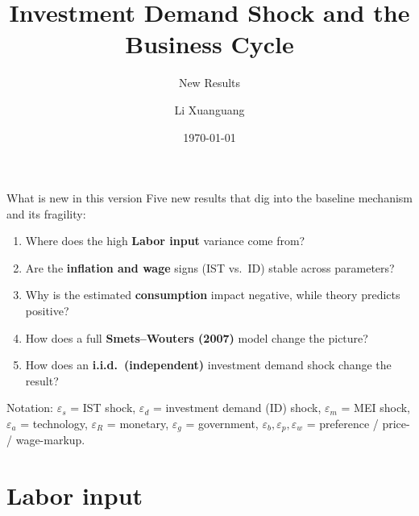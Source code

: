 \documentclass[10pt]{beamer}
\title{Investment Demand Shock and the Business Cycle}
\subtitle{New Results}
\author{Li Xuanguang}
\date{\today}
\begin{document}
\begin{frame}
	\titlepage
\end{frame}

\begin{frame}{What is new in this version}
	Five new results that dig into the baseline mechanism and its fragility:
	\begin{enumerate}
		\item Where does the high \textbf{Labor input} variance come from?
		\item Are the \textbf{inflation and wage} signs (IST vs.\ ID) stable across parameters?
		\item Why is the estimated \textbf{consumption} impact negative, while theory predicts positive?
		\item How does a full \textbf{Smets--Wouters (2007)} model change the picture?
		\item How does an \textbf{i.i.d.\ (independent)} investment demand shock change the result?
	\end{enumerate}

	\vspace{0.6em}
	\footnotesize
	Notation: $\varepsilon_s$ = IST shock, $\varepsilon_d$ = investment demand (ID) shock,
	$\varepsilon_m$ = MEI shock, $\varepsilon_a$ = technology, $\varepsilon_R$ = monetary,
	$\varepsilon_g$ = government, $\varepsilon_b,\varepsilon_p,\varepsilon_w$ = preference / price- / wage-markup.
\end{frame}

\section{Labor input}
\end{document}
